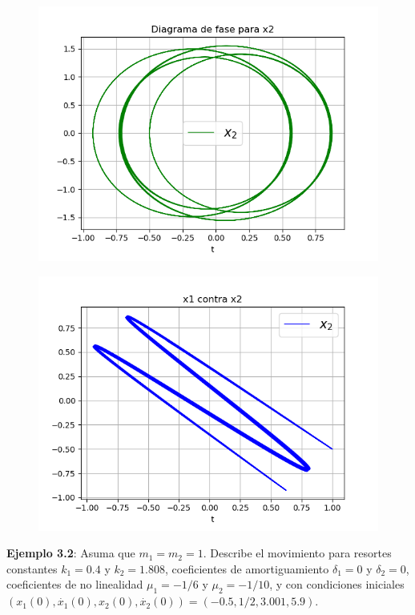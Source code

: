 \documentclass{article}
\begin{document}
\begin{figure}[H]
	\centering
    \includegraphics[width=\linewidth]{31_f2.png}
\end{figure}
\begin{figure}[H]
	\centering
    \includegraphics[width=\linewidth]{31_v.png}
\end{figure}
\textbf{Ejemplo 3.2}: Asuma que $m_{1}=m_{2}=1$. Describe el movimiento para resortes constantes $k_{1}=0.4$ y $k_{2}=1.808$, coeficientes de amortiguamiento $\delta_{1}=0$ y $\delta_{2}=0$, coeficientes de no linealidad $\mu_{1}=-1/6$ y $\mu_{2}=-1/10$, y con condiciones iniciales $(x_{1}(0),\dot{x_{1}}(0),x_{2}(0),\dot{x_{2}}(0))=(-0.5,1/2,3.001,5.9)$.\\
\end{document}
